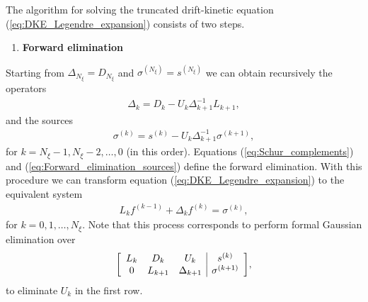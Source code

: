  The algorithm for solving the truncated drift-kinetic equation (\ref{eq:DKE_Legendre_expansion}) consists of two steps. 
 \begin{enumerate}
 	\item \textbf{Forward elimination}
 \end{enumerate} 	
 Starting from $\Delta_{N_\xi} = D_{N_\xi}$ and $\sigma^{(N_\xi)} = s^{(N_\xi)}$ we can obtain recursively the operators
 \begin{align}
 	\Delta_k = D_k - U_{k} \Delta_{k+1}^{-1} L_{k+1}, 
 	\label{eq:Schur_complements}
 \end{align} 
 and the sources
 \begin{align}
 	\sigma^{(k)} = s^{(k)} - U_k \Delta_{k+1}^{-1}    \sigma^{(k+1)},
 	\label{eq:Forward_elimination_sources}
 \end{align}
 for $k=N_\xi-1, N_\xi-2, \ldots, 0$ (in this order). Equations (\ref{eq:Schur_complements}) and (\ref{eq:Forward_elimination_sources}) define the forward elimination. With this procedure we can transform equation (\ref{eq:DKE_Legendre_expansion}) to the equivalent system
 \begin{align}
 	L_{k} f^{(k-1)} + \Delta_{k} f^{(k)} = \sigma^{(k)},
 	\label{eq:DKE_Forward_elimination}
 \end{align}
 for $k=0,1, \ldots, N_\xi$. Note that this process corresponds to perform formal Gaussian elimination over 
  \begin{align}
  	\Matrix{ccc|c}
  	{
  		L_{k} & D_{k} & U_k  & s^{(k)} \\
  		0& L_{k+1} & \Delta_{k+1}  & \sigma^{(k+1)} \\
  	}
  	,
	\label{eq:DKE_Forward_Elimination}
  \end{align}
  to eliminate $U_k$ in the first row.
  
